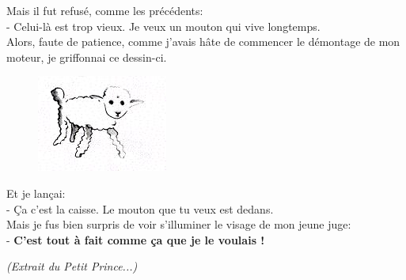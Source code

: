 \begin{multicols}{2}
  Mais il fut refusé, comme les précédents: \\
  - Celui-là est trop vieux. Je veux un mouton qui vive longtemps. \\
  Alors, faute de patience, comme j'avais hâte de commencer le démontage de mon moteur, je griffonnai ce dessin-ci.
  
  \begin{figure}[H]
    \centering
    \includegraphics[width=0.3\linewidth]{4x5-calcul-litteral/mouton2.png}
  \end{figure}

  Et je lançai: \\
  - Ça c'est la caisse. Le mouton que tu veux est dedans. \\
  Mais je fus bien surpris de voir s'illuminer le visage de mon jeune juge: \\
  - \textbf{C'est tout à fait comme ça que je le voulais ! }
\end{multicols}

\horrule{1px}


\textit{(Extrait du Petit Prince...)}

